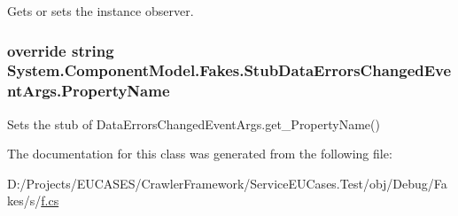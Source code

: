 Gets or sets the instance observer.

\hypertarget{class_system_1_1_component_model_1_1_fakes_1_1_stub_data_errors_changed_event_args_ab765a0ef268c30d6ef363a32b549f4e4}{
\subsubsection[{Property\-Name}]{\setlength{\rightskip}{0pt plus 5cm}override string System.\-Component\-Model.\-Fakes.\-Stub\-Data\-Errors\-Changed\-Event\-Args.\-Property\-Name\hspace{0.3cm}{\ttfamily [get]}}}\label{class_system_1_1_component_model_1_1_fakes_1_1_stub_data_errors_changed_event_args_ab765a0ef268c30d6ef363a32b549f4e4}


Sets the stub of Data\-Errors\-Changed\-Event\-Args.\-get\-\_\-\-Property\-Name()



The documentation for this class was generated from the following file\-:\begin{DoxyCompactItemize}
\item 
D\-:/\-Projects/\-E\-U\-C\-A\-S\-E\-S/\-Crawler\-Framework/\-Service\-E\-U\-Cases.\-Test/obj/\-Debug/\-Fakes/s/\hyperlink{s_2f_8cs}{f.\-cs}\end{DoxyCompactItemize}
